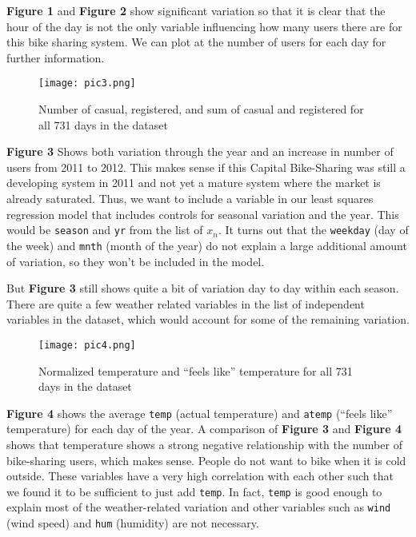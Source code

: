 \documentclass[
]{article}
\begin{document}
\textbf{Figure 1} and \textbf{Figure 2} show significant variation so that it is clear that the hour of the day is not the only variable influencing how many users there are for this bike sharing system. We can plot at the number of users for each day for further information.
\newpage
\begin{figure}
\centering
\texttt{[image: pic3.png]}
\caption{Number of casual, registered, and sum of casual and registered for all 731 days in the dataset}
\end{figure}

\textbf{Figure 3} Shows both variation through the year and an increase in number of users from 2011 to 2012. This makes sense if this Capital Bike-Sharing was still a developing system in 2011 and not yet a mature system where the market is already saturated. Thus, we want to include a variable in our least squares regression model that includes controls for seasonal variation and the year. This would be \texttt{season} and
\texttt{yr} from the list of \(x_{n}\). It turns out that the
\texttt{weekday} (day of the week) and \texttt{mnth} (month of the year) do not explain a large additional amount of variation, so they won't be included in the model.

But \textbf{Figure 3} still shows quite a bit of variation day to day within each season. There are quite a few weather related variables in the list of independent variables in the dataset, which would account for some of the remaining variation.

\newpage

\begin{figure}
\centering
\texttt{[image: pic4.png]}
\caption{Normalized temperature and ``feels like'' temperature for all 731 days in the dataset}
\end{figure}

\textbf{Figure 4} shows the average \texttt{temp} (actual temperature) and \texttt{atemp} (``feels like'' temperature) for each day of the year. A comparison of \textbf{Figure 3} and \textbf{Figure 4} shows that temperature shows a strong negative relationship with the number of bike-sharing users, which makes sense. People do not want to bike when it is cold outside. These variables have a very high correlation with each other such that we found it to be sufficient to just add \texttt{temp}. In fact, \texttt{temp} is good enough to explain most of the weather-related variation and other variables such as \texttt{wind} (wind speed) and \texttt{hum} (humidity) are not necessary.
\end{document}
